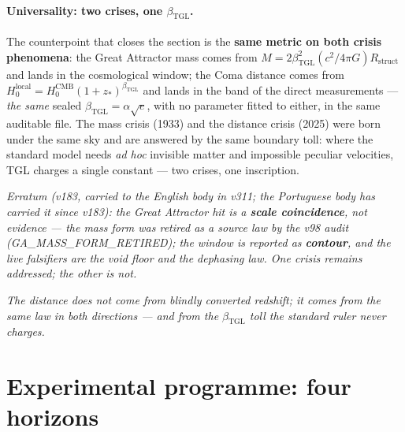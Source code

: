\documentclass[11pt]{article}
\newcommand{\bTGL}{\beta_{\mathrm{TGL}}}\newcommand{\Msun}{M_{\odot}}\newcommand{\TGL}{\mathrm{TGL}}
\theoremstyle{definition}\newtheorem{deriv}{Derivation}
\begin{document}
\paragraph{Universality: two crises, one $\bTGL$.} The counterpoint that closes the section is the \textbf{same metric on both crisis phenomena}: the Great Attractor mass comes from $M=2\bTGL^2(c^2/4\pi G)R_{\mathrm{struct}}$ and lands in the cosmological window; the Coma distance comes from $H_0^{\mathrm{local}}=H_0^{\mathrm{CMB}}(1+z_*)^{\bTGL}$ and lands in the band of the direct measurements --- \emph{the same} sealed $\bTGL=\alpha\sqrt e$, with no parameter fitted to either, in the same auditable file. The mass crisis (1933) and the distance crisis (2025) were born under the same sky and are answered by the same boundary toll: where the standard model needs \emph{ad hoc} invisible matter and impossible peculiar velocities, TGL charges a single constant --- two crises, one inscription.

\emph{Erratum (v183, carried to the English body in v311; the Portuguese body has carried it since v183): the Great Attractor hit is a \textbf{scale coincidence}, not evidence --- the mass form was retired as a source law by the v98 audit (\textsf{GA\_MASS\_FORM\_RETIRED}); the window is reported as \textbf{contour}, and the live falsifiers are the void floor and the dephasing law. One crisis remains addressed; the other is not.}

\emph{The distance does not come from blindly converted redshift; it comes from the same law in both directions --- and from the $\bTGL$ toll the standard ruler never charges.}

\section{Experimental programme: four horizons}\label{sec:horizons}
\end{document}
